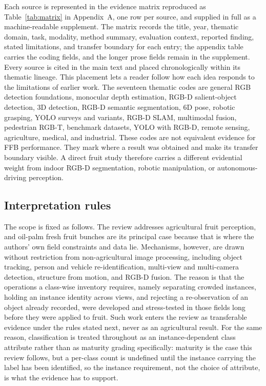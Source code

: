 Each source is represented in the evidence matrix reproduced as Table~\ref{tab:matrix} in Appendix~A, one row per source, and supplied in full as a machine-readable supplement. The matrix records the title, year, thematic domain, task, modality, method summary, evaluation context, reported finding, stated limitations, and transfer boundary for each entry; the appendix table carries the coding fields, and the longer prose fields remain in the supplement. Every source is cited in the main text and placed chronologically within its thematic lineage. This placement lets a reader follow how each idea responds to the limitations of earlier work. The seventeen thematic codes are general RGB detection foundations, monocular depth estimation, RGB-D salient-object detection, 3D detection, RGB-D semantic segmentation, 6D pose, robotic grasping, YOLO surveys and variants, RGB-D SLAM, multimodal fusion, pedestrian RGB-T, benchmark datasets, YOLO with RGB-D, remote sensing, agriculture, medical, and industrial. These codes are not equivalent evidence for FFB performance. They mark where a result was obtained and make its transfer boundary visible. A direct fruit study therefore carries a different evidential weight from indoor RGB-D segmentation, robotic manipulation, or autonomous-driving perception.

\subsection{Interpretation rules}
\label{sec:rules}

The scope is fixed as follows. The review addresses agricultural fruit perception, and oil-palm fresh fruit bunches are its principal case because that is where the authors' own field constraints and data lie. Mechanisms, however, are drawn without restriction from non-agricultural image processing, including object tracking, person and vehicle re-identification, multi-view and multi-camera detection, structure from motion, and RGB-D fusion. The reason is that the operations a class-wise inventory requires, namely separating crowded instances, holding an instance identity across views, and rejecting a re-observation of an object already recorded, were developed and stress-tested in those fields long before they were applied to fruit. Such work enters the review as transferable evidence under the rules stated next, never as an agricultural result. For the same reason, classification is treated throughout as an instance-dependent class attribute rather than as maturity grading specifically: maturity is the case this review follows, but a per-class count is undefined until the instance carrying the label has been identified, so the instance requirement, not the choice of attribute, is what the evidence has to support.

